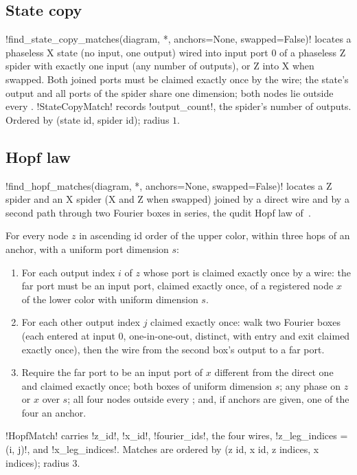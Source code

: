 \subsection{State copy}

\py!find_state_copy_matches(diagram, *, anchors=None, swapped=False)! locates a phaseless X state
(no input, one output) wired into input port $0$ of a phaseless Z spider with exactly one input
(any number of outputs), or Z into X when swapped. Both joined ports must be claimed exactly once
by the wire; the state's output and all ports of the spider share one dimension; both nodes lie
outside every \bbox{}. \py!StateCopyMatch! records \py!output_count!, the spider's number of
outputs. Ordered by (state id, spider id); radius $1$.

\subsection{Hopf law}

\py!find_hopf_matches(diagram, *, anchors=None, swapped=False)! locates a Z spider and an X spider
(X and Z when swapped) joined by a direct wire and by a second path through two Fourier boxes in
series, the qudit Hopf law of~\cite{poor2023zxw}.
\begin{algorithm}\label{alg:rewriting-hopf}
For every node $z$ in ascending id order of the upper color, within three hops of an anchor, with a
uniform port dimension $s$:
\begin{enumerate}
\item For each output index $i$ of $z$ whose port is claimed exactly once by a wire: the far port
  must be an input port, claimed exactly once, of a registered node $x$ of the lower color with
  uniform dimension $s$.
\item For each other output index $j$ claimed exactly once: walk two Fourier boxes (each entered
  at input $0$, one-in-one-out, distinct, with entry and exit claimed exactly once), then the wire
  from the second box's output to a far port.
\item Require the far port to be an input port of $x$ different from the direct one and claimed
  exactly once; both boxes of uniform dimension $s$; any phase on $z$ or $x$ over $s$; all four
  nodes outside every \bbox{}; and, if anchors are given, one of the four an anchor.
\end{enumerate}
\end{algorithm}
\py!HopfMatch! carries \py!z_id!, \py!x_id!, \py!fourier_ids!, the four wires, \py!z_leg_indices = (i, j)!,
and \py!x_leg_indices!. Matches are ordered by (z id, x id, z indices, x indices); radius $3$.

